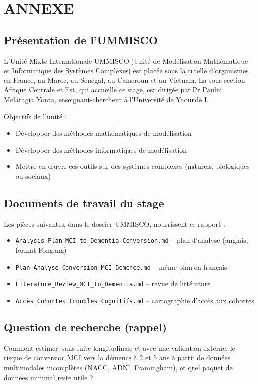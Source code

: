 \let\textcircled=\pgftextcircled
\chapter{ANNEXE}
\label{chap:annexes}

\newpage

\section{Présentation de l'UMMISCO}

L'Unité Mixte Internationale UMMISCO (Unité de Modélisation Mathématique et Informatique des Systèmes Complexes) est placée sous la tutelle d'organismes en France, au Maroc, au Sénégal, au Cameroun et au Vietnam. La sous-section Afrique Centrale et Est, qui accueille ce stage, est dirigée par Pr Paulin Melatagia Yonta, enseignant-chercheur à l'Université de Yaoundé I.

Objectifs de l'unité :
\begin{itemize}
\item Développer des méthodes mathématiques de modélisation
\item Développer des méthodes informatiques de modélisation
\item Mettre en œuvre ces outils sur des systèmes complexes (naturels, biologiques ou sociaux)
\end{itemize}

\section{Documents de travail du stage}

Les pièces suivantes, dans le dossier UMMISCO, nourrissent ce rapport :

\begin{itemize}
\item \texttt{Analysis\_Plan\_MCI\_to\_Dementia\_Conversion.md} -- plan d'analyse (anglais, format Fongang)
\item \texttt{Plan\_Analyse\_Conversion\_MCI\_Demence.md} -- même plan en français
\item \texttt{Literature\_Review\_MCI\_to\_Dementia.md} -- revue de littérature
\item \texttt{Accès Cohortes Troubles Cognitifs.md} -- cartographie d'accès aux cohortes
\end{itemize}

\section{Question de recherche (rappel)}

Comment estimer, sans fuite longitudinale et avec une validation externe, le risque de conversion MCI vers la démence à 2 et 5 ans à partir de données multimodales incomplètes (NACC, ADNI, Framingham), et quel paquet de données minimal reste utile ?
